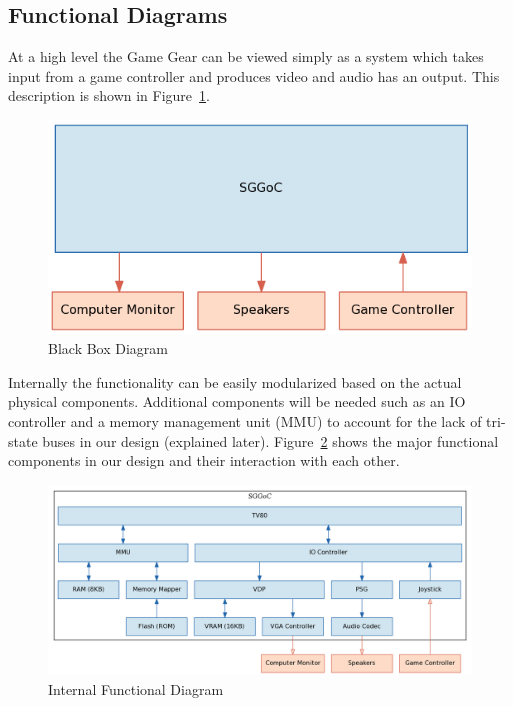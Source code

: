 \documentclass{article}
\begin{document}
\newpage
\subsection{Functional Diagrams}

At a high level the Game Gear can be viewed simply as a system which
takes input from a game controller and produces video and audio has an
output. This description is shown in Figure~\ref{fig:external}.

\begin{figure}[H]
\centering
\includegraphics[scale=0.4]{../block_diagrams/block_diagram_external.png}
\caption{Black Box Diagram}
\label{fig:external}
\end{figure}

Internally the functionality can be easily modularized based on the
actual physical components. Additional components will be needed such
as an IO controller and a memory management unit (MMU) to account for 
the lack of tri-state buses in our design (explained later).
Figure~\ref{fig:internal} shows the major functional components in our
design and their interaction with each other.

\begin{figure}[H]
\centering
\includegraphics[scale=0.4]{../block_diagrams/block_diagram_internal.png}
\caption{Internal Functional Diagram}
\label{fig:internal}
\end{figure}
\end{document}
